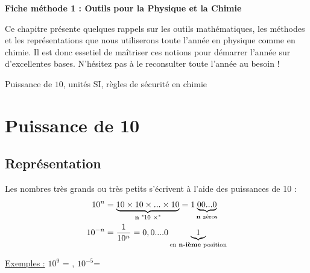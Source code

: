 \newpage

\renewcommand{\thesubsection}{\textcolor{red}{\Roman{section}.\arabic{subsection}}}
\renewcommand{\thesubsubsection}{\textcolor{red}{\Roman{section}.\arabic{subsection}.\alph{subsubsection}}}

\setcounter{section}{0}
\sndEnTeteUn

\begin{center}
\begin{mdframed}[style=titr, leftmargin=60pt, rightmargin=60pt, innertopmargin=7pt, innerbottommargin=7pt, innerrightmargin=8pt, innerleftmargin=8pt]

\begin{center}
\large{\textbf{Fiche méthode 1 : Outils pour la Physique et la Chimie}}
\end{center}

\end{mdframed}
\end{center}
Ce chapitre présente quelques rappels sur les outils mathématiques, les méthodes et les représentations que nous utiliserons toute l'année en physique comme en chimie. Il est donc essetiel de maîtriser ces notions pour démarrer l'année sur d'excellentes bases. N'hésitez pas à le reconsulter toute l'année au besoin !

\begin{tcolorbox}[colback=blue!5!white,colframe=blue!75!black,title=Mots clés du chapitre :]
Puissance de $10$, unités SI, règles de sécurité en chimie
\end{tcolorbox}

\section{Puissance de 10}
\subsection{Représentation}
Les nombres très grands ou très petits s'écrivent à l'aide des puissances de 10 :
\begin{align*}
    10^n &= \underbrace{10\times10\times ... \times 10}_{\text{\textbf{n} "10 $\times$"}} = 1\underbrace{00...0}_{\text{\textbf{n} zéros}} \\
    10^{-n} &= \frac{1}{10^n} = 0,0....0\underbrace{1}_{\text{en \textbf{n-ième} position}}
\end{align*}

\underline{Exemples :} $10^9$ = ,    $10^{-5}$=\\

